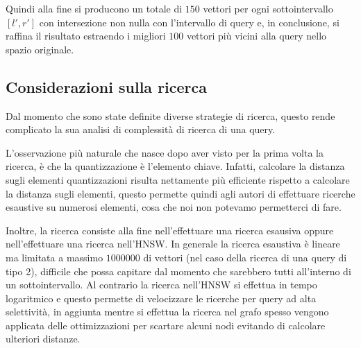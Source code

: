 Quindi alla fine si producono un totale di $150$ vettori per ogni sottointervallo
$[l',r']$ con intersezione non nulla con l'intervallo di query e, in conclusione, 
si raffina il risultato estraendo i migliori $100$ vettori più vicini alla query 
nello spazio originale.   

\subsection{Considerazioni sulla ricerca}

Dal momento che sono state definite diverse strategie di ricerca, questo rende 
complicato la sua analisi di complessità di ricerca di una query.

L'osservazione più naturale che nasce dopo aver visto per la prima volta la ricerca,
è che la quantizzazione è l'elemento chiave. Infatti, calcolare la distanza sugli 
elementi quantizzazioni risulta nettamente più efficiente rispetto a calcolare la 
distanza sugli elementi, questo permette quindi agli autori di effettuare ricerche 
esaustive su numerosi elementi, cosa che noi non potevamo permetterci di fare.

Inoltre, la ricerca consiste alla fine nell'effettuare una ricerca esausiva 
oppure nell'effettuare una ricerca nell'HNSW. In generale la ricerca esaustiva è 
lineare ma limitata a massimo $1000000$ di vettori (nel caso della ricerca di una 
query di tipo 2), difficile che possa capitare dal momento che sarebbero tutti 
all'interno di un sottointervallo. Al contrario la ricerca nell'HNSW si effettua 
in tempo logaritmico e questo permette di velocizzare le ricerche per query ad 
alta selettività, in aggiunta mentre si effettua la ricerca nel grafo spesso vengono 
applicata delle ottimizzazioni per scartare alcuni nodi evitando di calcolare 
ulteriori distanze. 


